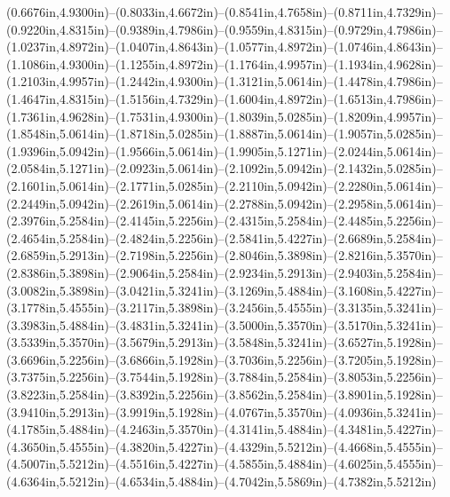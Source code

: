 (0.6676in,4.9300in)--(0.8033in,4.6672in)--(0.8541in,4.7658in)--(0.8711in,4.7329in)--(0.9220in,4.8315in)--(0.9389in,4.7986in)--(0.9559in,4.8315in)--(0.9729in,4.7986in)--(1.0237in,4.8972in)--(1.0407in,4.8643in)--(1.0577in,4.8972in)--(1.0746in,4.8643in)--(1.1086in,4.9300in)--(1.1255in,4.8972in)--(1.1764in,4.9957in)--(1.1934in,4.9628in)--(1.2103in,4.9957in)--(1.2442in,4.9300in)--(1.3121in,5.0614in)--(1.4478in,4.7986in)--(1.4647in,4.8315in)--(1.5156in,4.7329in)--(1.6004in,4.8972in)--(1.6513in,4.7986in)--(1.7361in,4.9628in)--(1.7531in,4.9300in)--(1.8039in,5.0285in)--(1.8209in,4.9957in)--(1.8548in,5.0614in)--(1.8718in,5.0285in)--(1.8887in,5.0614in)--(1.9057in,5.0285in)--(1.9396in,5.0942in)--(1.9566in,5.0614in)--(1.9905in,5.1271in)--(2.0244in,5.0614in)--(2.0584in,5.1271in)--(2.0923in,5.0614in)--(2.1092in,5.0942in)--(2.1432in,5.0285in)--(2.1601in,5.0614in)--(2.1771in,5.0285in)--(2.2110in,5.0942in)--(2.2280in,5.0614in)--(2.2449in,5.0942in)--(2.2619in,5.0614in)--(2.2788in,5.0942in)--(2.2958in,5.0614in)--(2.3976in,5.2584in)--(2.4145in,5.2256in)--(2.4315in,5.2584in)--(2.4485in,5.2256in)--(2.4654in,5.2584in)--(2.4824in,5.2256in)--(2.5841in,5.4227in)--(2.6689in,5.2584in)--(2.6859in,5.2913in)--(2.7198in,5.2256in)--(2.8046in,5.3898in)--(2.8216in,5.3570in)--(2.8386in,5.3898in)--(2.9064in,5.2584in)--(2.9234in,5.2913in)--(2.9403in,5.2584in)--(3.0082in,5.3898in)--(3.0421in,5.3241in)--(3.1269in,5.4884in)--(3.1608in,5.4227in)--(3.1778in,5.4555in)--(3.2117in,5.3898in)--(3.2456in,5.4555in)--(3.3135in,5.3241in)--(3.3983in,5.4884in)--(3.4831in,5.3241in)--(3.5000in,5.3570in)--(3.5170in,5.3241in)--(3.5339in,5.3570in)--(3.5679in,5.2913in)--(3.5848in,5.3241in)--(3.6527in,5.1928in)--(3.6696in,5.2256in)--(3.6866in,5.1928in)--(3.7036in,5.2256in)--(3.7205in,5.1928in)--(3.7375in,5.2256in)--(3.7544in,5.1928in)--(3.7884in,5.2584in)--(3.8053in,5.2256in)--(3.8223in,5.2584in)--(3.8392in,5.2256in)--(3.8562in,5.2584in)--(3.8901in,5.1928in)--(3.9410in,5.2913in)--(3.9919in,5.1928in)--(4.0767in,5.3570in)--(4.0936in,5.3241in)--(4.1785in,5.4884in)--(4.2463in,5.3570in)--(4.3141in,5.4884in)--(4.3481in,5.4227in)--(4.3650in,5.4555in)--(4.3820in,5.4227in)--(4.4329in,5.5212in)--(4.4668in,5.4555in)--(4.5007in,5.5212in)--(4.5516in,5.4227in)--(4.5855in,5.4884in)--(4.6025in,5.4555in)--(4.6364in,5.5212in)--(4.6534in,5.4884in)--(4.7042in,5.5869in)--(4.7382in,5.5212in)
